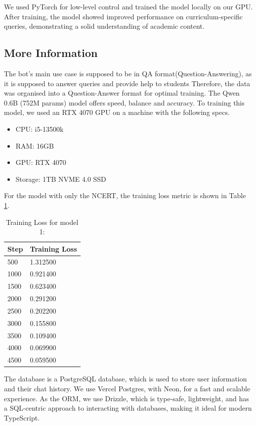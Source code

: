 \documentclass[9pt,a4paper,twocolumn,twoside]{tau-class/tau}
\begin{document}
We used PyTorch for low-level control and trained the model locally on our GPU. After training, the model showed improved performance on curriculum-specific queries, demonstrating a solid understanding of academic content.

\subsection{More Information}

The bot's main use case is supposed to be in QA format(Question-Answering), as it is supposed to answer queries and provide help to students Therefore, the data was organised into a Question-Answer format for optimal training. The Qwen 0.6B (752M params) model offers speed, balance and accuracy. To training this model, we used an RTX 4070 GPU on a machine with the following specs.
\begin{itemize}
	\item CPU: i5-13500k
	\item RAM: 16GB
	\item GPU: RTX 4070
	\item Storage: 1TB NVME 4.0 SSD
\end{itemize} For the model with only the NCERT, the training loss metric is shown in Table \ref{tab:train_loss}.
\begin{table}[H]
	\centering
	\caption{Training Loss for model 1:}
	\label{tab:train_loss}
	\begin{tabular}{ll}
		\toprule
		\textbf{Step} & \textbf{Training Loss} \\
		\midrule
		500           & 1.312500               \\
		1000          & 0.921400               \\
		1500          & 0.623400               \\
		2000          & 0.291200               \\
		2500          & 0.202200               \\
		3000          & 0.155800               \\
		3500          & 0.109400               \\
		4000          & 0.069900               \\
		4500          & 0.059500               \\
		\bottomrule
	\end{tabular}
\end{table}


The database is a PostgreSQL database, which is used to store user information and their chat history. We use Vercel Postgres, with Neon, for a fast and scalable experience. As the ORM, we use Drizzle, which is type-safe, lightweight, and has a SQL-centric approach to interacting with databases, making it ideal for modern TypeScript.
\end{document}
